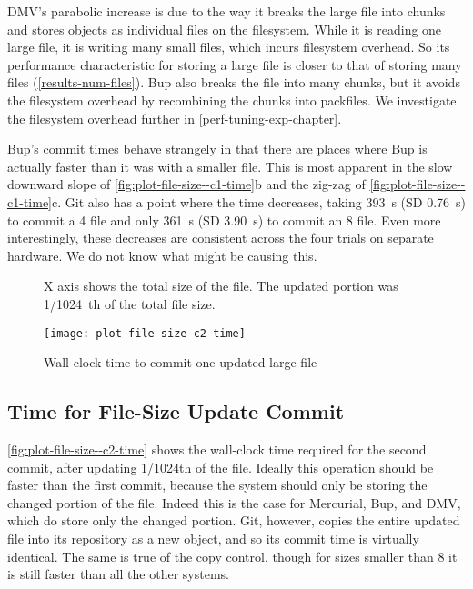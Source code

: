 DMV's parabolic increase is due to the way it breaks the large file into chunks
and stores objects as individual files on the filesystem. While it is reading
one large file, it is writing many small files, which incurs filesystem
overhead. So its performance characteristic for storing a large file is closer
to that of storing many files (\autoref{results-num-files}). Bup also breaks the
file into many chunks, but it avoids the filesystem overhead by recombining the
chunks into \glspl{packfile}. We investigate the filesystem overhead further in
\autoref{perf-tuning-exp-chapter}.

Bup's commit times behave strangely in that there are places where Bup is
actually faster than it was with a smaller file. This is most apparent in the
slow downward slope of \autoref{fig:plot-file-size--c1-time}b and the zig-zag of
\autoref{fig:plot-file-size--c1-time}c. Git also has a point where the time
decreases, taking \SI{393}{\s} (SD \SI{.76}{\s}) to commit a \SI{4}{\gib} file
and only \SI{361}{\s} (SD \SI{3.90}{\s}) to commit an \SI{8}{\gib} file. Even
more interestingly, these decreases are consistent across the four trials on
separate hardware. We do not know what might be causing this.

%


\begin{figure}[p]
    \begin{leftfullpage}
        \caption{Wall-clock time to commit one updated large file}
        \label{fig:plot-file-size--c2-time}
        \centering

        X axis shows the total size of the file. The updated portion was
        \SI{1/1024}{th} of the total file size.
        \explainlogsubfig

        \texttt{[image: plot-file-size--c2-time]}
    \end{leftfullpage}
\end{figure}

\cleardoublepage

\subsection{Time for File-Size Update Commit}
\label{results-file-size--c2-time}

\autoref{fig:plot-file-size--c2-time} shows the wall-clock time required for the
second \gls{commit}, after updating \num{1/1024}th of the file. Ideally this
operation should be faster than the first \gls{commit}, because the system
should only be storing the changed portion of the file. Indeed this is the case
for Mercurial, Bup, and \gls{DMV}, which do store only the changed portion. Git,
however, copies the entire updated file into its \gls{repository} as a new
object, and so its \gls{commit} time is virtually identical. The same is true of
the copy control, though for sizes smaller than \SI{8}{\gib} it is still faster
than all the other systems.

